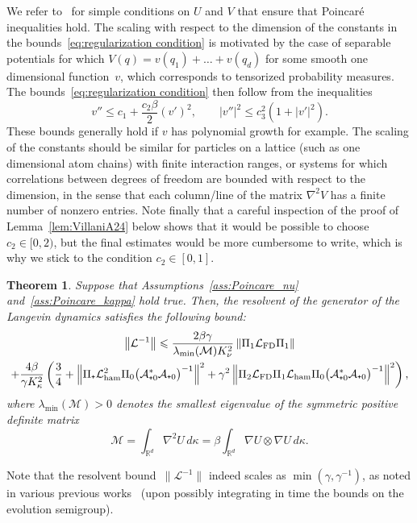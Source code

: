 \documentclass[10pt]{amsart}
\newtheorem{theo}{Theorem}[section]
\theoremstyle{definition}\newtheorem{defi}[theo]{Definition}\newtheorem{rema}[theo]{Remark}\newtheorem{exam}[theo]{Example}\newtheorem{exem}[theo]{Example}\newtheorem{nota}[theo]{Notation}
\newcommand{\cL}{\mathcal{L}}
\newcommand{\cLa}{\mathcal{A}}
\newcommand{\cLM}{\mathcal{M}}
\newcommand{\R}{\mathbb{R}}
\newcommand{\cLham}{\mathcal{L}_{\rm ham}}
\newcommand{\cLFD}{\mathcal{L}_{\rm FD}}
\newcommand{\subplus}{\textnormal{\texttt{+}}}
\renewcommand{\leq}{\leqslant}
\begin{document}
We refer to~\cite{BBCG} for simple conditions on $U$ and $V$ that ensure that Poincaré inequalities hold. The scaling with respect to the dimension of the constants in the bounds~\eqref{eq:regularization condition} is motivated by the case of separable potentials for which $V(q) = v(q_1) + \dots + v(q_d)$ for some smooth one dimensional function~$v$, which corresponds to tensorized probability measures. The bounds~\eqref{eq:regularization condition} then follow from the inequalities
\[
v'' \leq c_1 + \frac{c_2 \beta}{2} (v')^2, \qquad \left|v''\right|^2 \leq c_3^2 \left(1+\left|v'\right|^2 \right).
\]
These bounds generally hold if $v$ has polynomial growth for example. The scaling of the constants should be similar for particles on a lattice (such as one dimensional atom chains) with finite interaction ranges, or systems for which correlations between degrees of freedom are bounded with respect to the dimension, in the sense that each column/line of the matrix $\nabla^2 V$ has a finite number of nonzero entries. Note finally that a careful inspection of the proof of Lemma~\ref{lem:VillaniA24} below shows that it would be possible to choose $c_2 \in [0,2)$, but the final estimates would be more cumbersome to write, which is why we stick to the condition $c_2 \in [0,1]$.

\begin{theo}
Suppose that Assumptions~\ref{ass:Poincare_nu} and~\ref{ass:Poincare_kappa} hold true. Then, the resolvent of the generator of the Langevin dynamics satisfies the following bound:
\begin{multline}\label{eq:bounds_invL_Langevin}
\left\|\cL^{-1}\right\| \leq \frac{2\beta\gamma}{\lambda_{\min}(\cLM) K_\nu^2} \left\|\Pi_1 \cLFD \Pi_1\right\| \\
+ \frac{4\beta}{\gamma K_\kappa^2} \left(\frac34 + \left\| \Pi_\subplus \cLham^2 \Pi_0 \big(\cLa_{\subplus 0}^*\cLa_{\subplus 0}\big)^{-1} \right\|^2 + \gamma^2 \left\| \Pi_2 \cLFD \Pi_1 \cLham \Pi_0 \big(\cLa_{\subplus 0}^*\cLa_{\subplus 0}\big)^{-1} \right\|^2 \right),
\end{multline}
where $\lambda_{\min}(\cLM) > 0$ denotes the smallest eigenvalue of the symmetric positive definite matrix
\[
\cLM = \int_{\R^d} \nabla^2 U \, d\kappa = \beta \int_{\R^d} \nabla U \otimes \nabla U \, d\kappa.
\]
\end{theo}

Note that the resolvent bound~$\|\cL^{-1}\|$ indeed scales as $ \min(\gamma,\gamma^{-1})$, as noted in various previous works~\cite{DKMS13,GS16,IOS19} (upon possibly integrating in time the bounds on the evolution semigroup).
\end{document}
